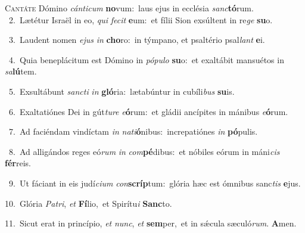 \lettrine{\initial\textcolor{\initialcolor}{C}}{antáte} Dómino \textit{cán}\-\textit{ti}\textit{cum} \textbf{no}\-vum:~\star laus ejus in ecclésia \textit{sanc}\-\textbf{tó}rum.\\
{\numbfont\textcolor{\numbcolor}{~2.}}~Lætétur Israël in eo, \textit{qui} \textit{fe}\-\textit{cit} \textbf{e}\-um:~\star et fílii Sion exsúltent in re\textit{ge} \textbf{su}\-o.\par
{\numbfont\textcolor{\numbcolor}{~3.}}~Laudent nomen \textit{e}\-\textit{jus} \textit{in} \textbf{cho}\-ro:~\star in týmpano, et psaltério psal\textit{lant} \textbf{e}\-i.\par
{\numbfont\textcolor{\numbcolor}{~4.}}~Quia beneplácitum est Dómino in \textit{pó}\-\textit{pu}\textit{lo} \textbf{su}\-o:~\star et exaltábit mansuétos in \textit{sa}\-\textbf{lú}tem.\par
{\numbfont\textcolor{\numbcolor}{~5.}}~Exsultábunt \textit{sanc}\-\textit{ti} \textit{in} \textbf{gló}\-ria:~\star lætabúntur in cubíli\textit{bus} \textbf{su}\-is.\par
{\numbfont\textcolor{\numbcolor}{~6.}}~Exaltatiónes Dei in gút\-\textit{tu}\-\textit{re} \textit{e}\-\textbf{ó}rum:~\star et gládii ancípites in mánibus \textit{e}\-\textbf{ó}rum.\par
{\numbfont\textcolor{\numbcolor}{~7.}}~Ad faciéndam vindíctam \textit{in} \textit{na}\-\textit{ti}\textbf{ó}nibus:~\star increpatiónes \textit{in} \textbf{pó}\-pulis.\par
{\numbfont\textcolor{\numbcolor}{~8.}}~Ad alligándos reges eó\textit{rum} \textit{in} \textit{com}\-\textbf{pé}dibus:~\star et nóbiles eórum in máni\textit{cis} \textbf{fér}\-reis.\par
{\numbfont\textcolor{\numbcolor}{~9.}}~Ut fáciant in eis judí\-\textit{ci}\-\textit{um} \textit{con}\-\textbf{scríp}tum:~\star glória hæc est ómnibus sanc\textit{tis} \textbf{e}\-jus.\par
{\numbfont\textcolor{\numbcolor}{10.}}~Glória \textit{Pa}\-\textit{tri}, \textit{et} \textbf{Fí}\-lio,~\star et Spirítu\textit{i} \textbf{Sanc}\-to.\par
{\numbfont\textcolor{\numbcolor}{11.}}~Sicut erat in princípio, \textit{et} \textit{nunc}\-, \textit{et} \textbf{sem}\-per,~\star et in sǽcula sæculó\-\textit{rum}\-. \textbf{A}\-men.\par
